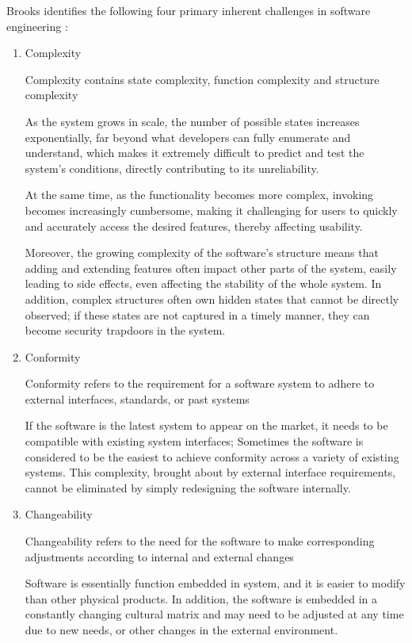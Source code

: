 \documentclass[11pt]{article}
\begin{document}
Brooks identifies the following four primary inherent challenges in software engineering \cite{brooks1987no}:
\begin{enumerate}
\item Complexity 

Complexity contains state complexity, function complexity and structure complexity

   As the system grows in scale, the number of possible states increases exponentially, far beyond what developers can fully enumerate and understand, which makes it extremely difficult to predict and test the system’s conditions, directly contributing to its unreliability. 

   At the same time, as the functionality becomes more complex, invoking becomes increasingly cumbersome, making it challenging for users to quickly and accurately access the desired features, thereby affecting usability. 

   Moreover, the growing complexity of the software's structure means that adding and extending features often impact other parts of the system, easily leading to side effects, even affecting the stability of the whole system. In addition, complex structures often own hidden states that cannot be directly observed; if these states are not captured in a timely manner, they can become security trapdoors in the system.

\item Conformity

Conformity refers to the requirement for a software system to adhere to external interfaces, standards, or past systems

   If the software is the latest system to appear on the market, it needs to be compatible with existing system interfaces; Sometimes the software is considered to be the easiest to achieve conformity across a variety of existing systems. This complexity, brought about by external interface requirements, cannot be eliminated by simply redesigning the software internally.

\item Changeability

Changeability refers to the need for the software to make corresponding adjustments according to internal and external changes

   Software is essentially function embedded in system, and it is easier to modify than other physical products. In addition, the software is embedded in a constantly changing cultural matrix and may need to be adjusted at any time due to new needs, or other changes in the external environment.


\end{enumerate}
\end{document}
